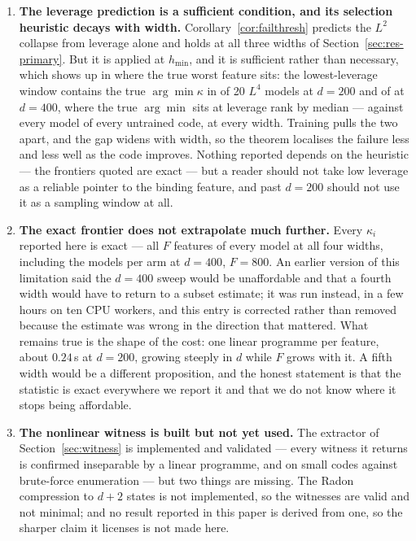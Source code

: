 \documentclass[preprint,12pt]{elsarticle}
\theoremstyle{definition}
\begin{document}
\begin{enumerate}[leftmargin=*,itemsep=1pt]
\item \textbf{The leverage prediction is a sufficient condition, and its selection heuristic decays
with width.} Corollary~\ref{cor:failthresh} predicts the $L^2$ collapse from leverage alone and
holds at all three widths of Section~\ref{sec:res-primary}. But it is applied at $h_{\min}$, and it
is sufficient rather than necessary, which shows up in where the true worst feature sits: the
lowest-leverage window contains the true $\arg\min\kappa$ in \FullLfourTwoHundredArgminFound{} of 20
$L^4$ models at $d=200$ and \SubsetFourHundredFound{} of \ScSeeds{} at $d=400$, where the true
$\arg\min$ sits at leverage rank \SubsetFourHundredRank{} by median --- against every model of every
untrained code, at every width. Training pulls the two apart, and the gap widens with width, so the
theorem localises the failure less and less well as the code improves. Nothing reported depends on
the heuristic --- the frontiers quoted are exact --- but a reader should not take low leverage as a
reliable pointer to the binding feature, and past $d=200$ should not use it as a sampling window at
all.

\item \textbf{The exact frontier does not extrapolate much further.} Every $\kappa_i$ reported here is
exact --- all $F$ features of every model at all four widths, including the \ScSeeds{} models per arm
at $d=400$, $F=800$. An earlier version of this limitation said the $d=400$ sweep would be
unaffordable and that a fourth width would have to return to a subset estimate; it was run instead,
in a few hours on ten CPU workers, and this entry is corrected rather than removed because the
estimate was wrong in the direction that mattered. What remains true is the shape of the cost: one
linear programme per feature, about $0.24$\,s at $d=200$, growing steeply in $d$ while $F$ grows with
it. A fifth width would be a different proposition, and the honest statement is that the statistic is
exact everywhere we report it and that we do not know where it stops being affordable.

\item \textbf{The nonlinear witness is built but not yet used.} The extractor of
Section~\ref{sec:witness} is implemented and validated --- every witness it returns is confirmed
inseparable by a linear programme, and on small codes against brute-force enumeration --- but two
things are missing. The Radon compression to $d+2$ states is not implemented, so the witnesses are
valid and not minimal; and no result reported in this paper is derived from one, so the sharper
claim it licenses is not made here.


\end{enumerate}
\end{document}
